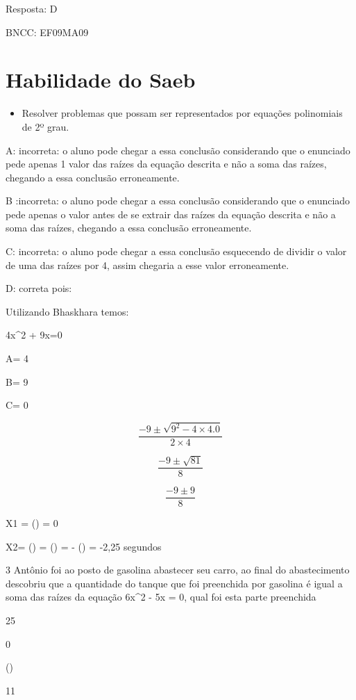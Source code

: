 Resposta: D

BNCC: EF09MA09

\section{Habilidade do Saeb}

\begin{itemize}
\tightlist

\item 
  Resolver problemas que possam ser representados por equações
  polinomiais de 2º grau.
\end{itemize}

A: incorreta: o aluno pode chegar a essa conclusão considerando que o
enunciado pede apenas 1 valor das raízes da equação descrita e não a
soma das raízes, chegando a essa conclusão erroneamente.

B :incorreta: o aluno pode chegar a essa conclusão considerando que o
enunciado pede apenas o valor antes de se extrair das raízes da equação
descrita e não a soma das raízes, chegando a essa conclusão
erroneamente.

C: incorreta: o aluno pode chegar a essa conclusão esquecendo de dividir
o valor de uma das raízes por 4, assim chegaria a esse valor
erroneamente.

D: correta pois:

Utilizando Bhaskhara temos:

4x^2 + 9x=0

A= 4

B= 9

C= 0

\[\frac{- 9 \pm \sqrt{9^{2} - 4\times 4.0}}{2\times 4}\]

\[\frac{- 9 \pm \sqrt{81}}{8}\]

\[\frac{- 9 \pm 9}{8}\]

X1 = () = 0

X2= () = () = - () =
-2,25 segundos

\num{3} Antônio foi ao posto de gasolina abastecer seu carro, ao final do
abastecimento descobriu que a quantidade do tanque que foi preenchida
por gasolina é igual a soma das raízes da equação 6x^2 - 5x = 0, qual foi
esta parte preenchida

\item 25
\item 0
\item ()
\item 11

